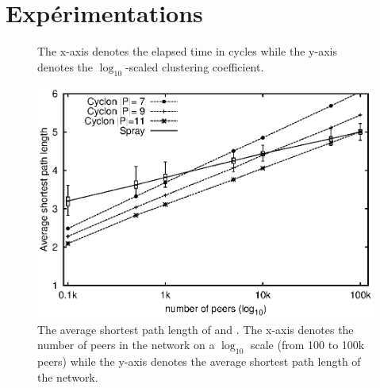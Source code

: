 
\section{Expérimentations}

\begin{figure}
  \centering
  \hspace{10pt}
  \caption{\label{fig:clustering}The x-axis denotes the elapsed time in cycles
    while the y-axis denotes the $\log_{10}$-scaled clustering coefficient.}
\end{figure}

\begin{figure}
  \centering
  \includegraphics[width=\textwidth]{img/spray/avgpath.eps}
  \caption{\label{fig:avgpath}The average shortest path length of \SPRAY and
    \CYCLON. The x-axis denotes the number of peers in the network on a
    $\log_{10}$ scale (from 100 to 100k peers) while the y-axis denotes the
    average shortest path length of the network.}
\end{figure}


